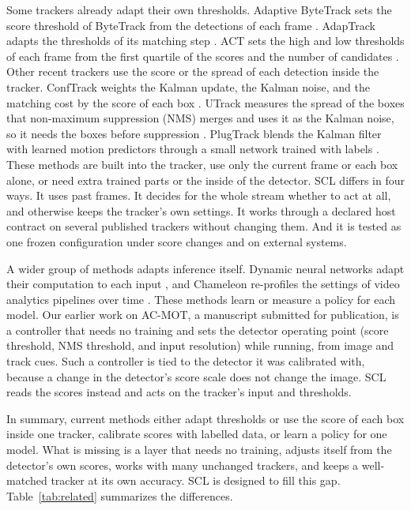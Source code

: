 \documentclass[pdflatex,sn-mathphys-num]{sn-jnl}
\newcommand{\scl}{SCL}
\begin{document}
Some trackers already adapt their own thresholds. Adaptive ByteTrack sets the
score threshold of ByteTrack from the detections of each frame
\cite{ma2023adaptivebytetrack}. AdapTrack adapts the thresholds of its
matching step \cite{shim2024adaptrack}. ACT sets the high and low thresholds
of each frame from the first quartile of the scores and the number of
candidates \cite{act2026adaptive}. Other recent trackers use the score or the
spread of each detection inside the tracker. ConfTrack weights the Kalman
update, the Kalman noise, and the matching cost by the score of each box
\cite{jung2024conftrack}. UTrack measures the spread of the boxes that
non-maximum suppression (NMS) merges and uses it as the Kalman noise, so it needs the
boxes before suppression \cite{solano2025utrack}. PlugTrack blends the Kalman
filter with learned motion predictors through a small network trained with
labels \cite{kim2026plugtrack}. These methods are built into the tracker, use
only the current frame or each box alone, or need extra trained parts or the
inside of the detector. \scl{} differs in four ways. It uses past
frames. It decides for the whole stream whether to act at all, and otherwise
keeps the tracker's own settings. It works through a declared host contract
on several published trackers without changing them. And it is tested as one
frozen configuration under score changes and on external systems.

A wider group of methods adapts inference itself. Dynamic neural networks
adapt their computation to each input \cite{han2022dynamic}, and Chameleon
re-profiles the settings of video analytics pipelines over time
\cite{jiang2018chameleon}. These methods learn or measure a policy for each
model. Our earlier work on AC-MOT, a manuscript submitted for publication,
is a controller that needs no training and sets the detector operating point
(score threshold, NMS threshold, and input resolution) while running, from
image and track cues. Such a controller is tied to the detector it was calibrated with,
because a change in the detector's score scale does not change the image.
\scl{} reads the scores instead and acts on the tracker's input and
thresholds.

In summary, current methods either adapt thresholds or use the score of each
box inside one tracker, calibrate scores with labelled data, or learn a policy
for one model. What is missing is a layer that needs no training, adjusts itself
from the detector's own scores, works with many unchanged trackers, and keeps
a well-matched tracker at its own accuracy. \scl{} is designed to fill this
gap. Table~\ref{tab:related} summarizes the differences.
\end{document}
